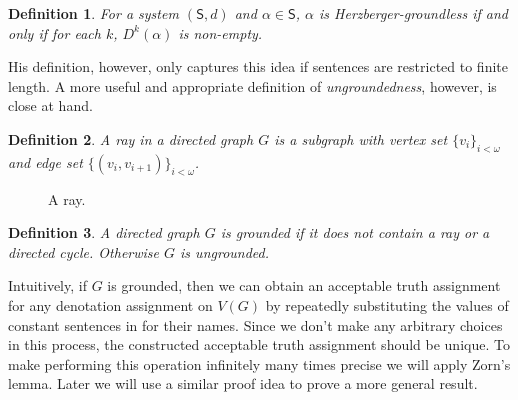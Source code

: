 \documentclass[12pt]{article}
\newtheorem{defn}{Definition}
\theoremstyle{remark}
\def\S{\textsf{S}}
\begin{document}
\begin{defn}
For a system $(\S,d)$ and $\alpha \in \S$, $\alpha$ is Herzberger-groundless if and only if for each $k$, $D^k(\alpha)$ is non-empty. 
\end{defn}

His definition, however, only captures this idea if sentences are restricted to finite length. A more useful and appropriate definition of \textit{ungroundedness}, however, is close at hand.

\begin{defn}
A \emph{ray} in a directed graph $G$ is a subgraph with vertex set $\{v_i\}_{i < \omega}$ and edge set $\{(v_i, v_{i + 1})\}_{i < \omega}$.
\end{defn}

\begin{figure}[h]
\centering
{}
\caption{A ray.}
\end{figure}

\begin{defn}
A directed graph $G$ is \emph{grounded} if it does not contain a ray or a directed cycle.  Otherwise $G$ is \emph{ungrounded}.
\end{defn}

Intuitively, if $G$ is grounded, then we can obtain an acceptable truth assignment for any denotation assignment on $V(G)$ by repeatedly substituting the values of constant sentences in for their names.  Since we don't make any arbitrary choices in this process, the constructed acceptable truth assignment should be unique.  To make performing this operation infinitely many times precise we will apply Zorn's lemma.  Later we will use a similar proof idea to prove a more general result.
\end{document}
